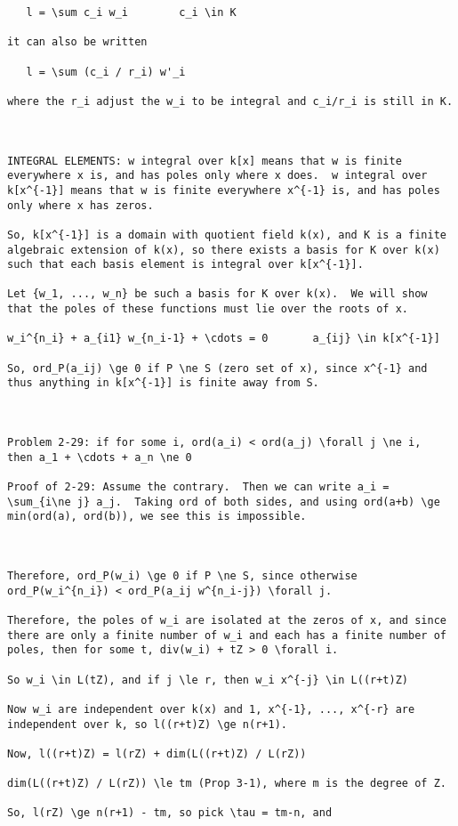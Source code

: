 {\begin{verbatim}
   l = \sum c_i w_i        c_i \in K

it can also be written

   l = \sum (c_i / r_i) w'_i

where the r_i adjust the w_i to be integral and c_i/r_i is still in K.



INTEGRAL ELEMENTS: w integral over k[x] means that w is finite
everywhere x is, and has poles only where x does.  w integral over
k[x^{-1}] means that w is finite everywhere x^{-1} is, and has poles
only where x has zeros.

So, k[x^{-1}] is a domain with quotient field k(x), and K is a finite
algebraic extension of k(x), so there exists a basis for K over k(x)
such that each basis element is integral over k[x^{-1}].

Let {w_1, ..., w_n} be such a basis for K over k(x).  We will show
that the poles of these functions must lie over the roots of x.

w_i^{n_i} + a_{i1} w_{n_i-1} + \cdots = 0       a_{ij} \in k[x^{-1}]

So, ord_P(a_ij) \ge 0 if P \ne S (zero set of x), since x^{-1} and
thus anything in k[x^{-1}] is finite away from S.



Problem 2-29: if for some i, ord(a_i) < ord(a_j) \forall j \ne i,
then a_1 + \cdots + a_n \ne 0

Proof of 2-29: Assume the contrary.  Then we can write a_i =
\sum_{i\ne j} a_j.  Taking ord of both sides, and using ord(a+b) \ge
min(ord(a), ord(b)), we see this is impossible.



Therefore, ord_P(w_i) \ge 0 if P \ne S, since otherwise
ord_P(w_i^{n_i}) < ord_P(a_ij w^{n_i-j}) \forall j.

Therefore, the poles of w_i are isolated at the zeros of x, and since
there are only a finite number of w_i and each has a finite number of
poles, then for some t, div(w_i) + tZ > 0 \forall i.

So w_i \in L(tZ), and if j \le r, then w_i x^{-j} \in L((r+t)Z)

Now w_i are independent over k(x) and 1, x^{-1}, ..., x^{-r} are
independent over k, so l((r+t)Z) \ge n(r+1).

Now, l((r+t)Z) = l(rZ) + dim(L((r+t)Z) / L(rZ))

dim(L((r+t)Z) / L(rZ)) \le tm (Prop 3-1), where m is the degree of Z.

So, l(rZ) \ge n(r+1) - tm, so pick \tau = tm-n, and


\end{verbatim}}
